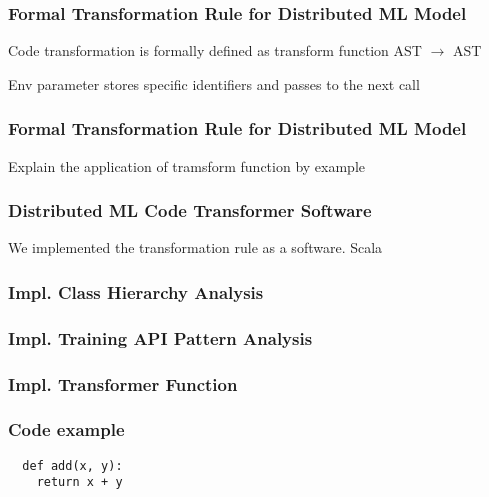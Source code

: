 \documentclass{beamer}
\begin{document}
\begin{frame}
  \frametitle{Formal Transformation Rule for Distributed ML Model}
  Code transformation is formally defined as transform function
  AST $\rightarrow$ AST
  
  Env parameter stores specific identifiers and passes to the next call
  
\end{frame}

\begin{frame}
  \frametitle{Formal Transformation Rule for Distributed ML Model}
  Explain the application of tramsform function by example  
\end{frame}


\begin{frame}
  \frametitle{Distributed ML Code Transformer Software}
  We implemented the transformation rule as a software.
  Scala
\end{frame}

\begin{frame}
  \frametitle{Impl. Class Hierarchy Analysis}
\end{frame}

\begin{frame}
  \frametitle{Impl. Training API Pattern Analysis}
\end{frame}

\begin{frame}
  \frametitle{Impl. Transformer Function}
\end{frame}

\begin{frame}
  \frametitle{}
\end{frame}

\begin{frame}[fragile]
  \frametitle{Code example}
  \begin{verbatim}
  def add(x, y):
    return x + y
  \end{verbatim}
\end{frame}
\end{document}
